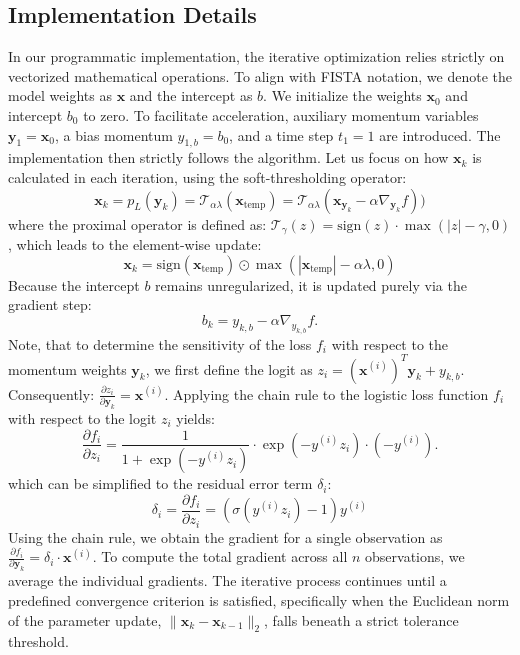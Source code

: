 \documentclass[12pt,a4paper]{article}
\begin{document}
\subsection{Implementation Details}
In our programmatic implementation, the iterative optimization relies strictly on vectorized mathematical operations. To align with FISTA notation, we denote the model weights as $\mathbf{x}$ and the intercept as $b$. We initialize the weights $\mathbf{x}_0$ and intercept $b_0$ to zero. To facilitate acceleration, auxiliary momentum variables $\mathbf{y}_1 = \mathbf{x}_0$, a bias momentum $y_{1,b} = b_0$, and a time step $t_1 = 1$ are introduced. The implementation then strictly follows the algorithm. Let us focus on how $\mathbf{x}_k$ is calculated in each iteration, using the soft-thresholding operator:
    $$
        \mathbf{x}_k = p_L(\mathbf{y}_k)=\mathcal{T}_{\alpha \lambda}(\mathbf{x}_{\text{temp}})=\mathcal{T}_{\alpha \lambda}(\mathbf{x}_{\mathbf{y}_{k}} - \alpha \nabla_{\mathbf{y}_k} f))
    $$
    where the proximal operator is defined as:
        $ \mathcal{T}_{\gamma}(z) = \text{sign}(z) \cdot \max(|z| - \gamma, 0)$,      
    which leads to the element-wise update:
        $$ \mathbf{x}_k = \text{sign}(\mathbf{x}_{\text{temp}}) \odot \max(|\mathbf{x}_{\text{temp}}| - \alpha \lambda, 0)     $$
    Because the intercept $b$ remains unregularized, it is updated purely via the gradient step: $$b_k = y_{k,b} - \alpha \nabla_{y_{k,b}} f.$$
Note, that to determine the sensitivity of the loss $f_i$ with respect to the momentum weights $\mathbf{y}_k$, we first define the logit as $z_i = (\mathbf{x}^{(i)})^T \mathbf{y}_k + y_{k,b}$. Consequently:
        $ \frac{\partial z_i}{\partial \mathbf{y}_k} = \mathbf{x}^{(i)}     $.
    Applying the chain rule to the logistic loss function $f_i$ with respect to the logit $z_i$ yields:
    $$
        \frac{\partial f_i}{\partial z_i} = \frac{1}{1 + \exp\left(-y^{(i)} z_i\right)} \cdot \exp\left(-y^{(i)} z_i\right) \cdot \left(-y^{(i)}\right).
    $$
    which can be simplified to the residual error term $\delta_i$:
    $$
        \delta_i = \frac{\partial f_i}{\partial z_i} = \left(\sigma\left(y^{(i)} z_i\right) - 1\right) y^{(i)}
    $$
Using the chain rule, we obtain the gradient for a single observation as
        $ \frac{\partial f_i}{\partial \mathbf{y}_k} = \delta_i \cdot \mathbf{x}^{(i)}     $.
To compute the total gradient across all $n$ observations, we average the individual gradients. The iterative process continues until a predefined convergence criterion is satisfied, specifically when the Euclidean norm of the parameter update, $\|\mathbf{x}_k - \mathbf{x}_{k-1}\|_2$, falls beneath a strict tolerance threshold.
\end{document}
